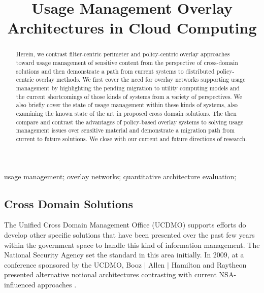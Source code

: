 \documentclass[10pt, conference, compsocconf]{IEEEtran}
\begin{document}
\title{Usage Management Overlay Architectures in Cloud Computing}

\author{
\and
{}
}

\maketitle


\begin{abstract}
Herein, we contrast filter-centric perimeter and policy-centric overlay approaches toward usage management of sensitive content from the perspective of cross-domain solutions and then demonstrate a path from current systems to distributed policy-centric overlay methods.  We first cover the need for overlay networks supporting usage management by highlighting the pending migration to utility computing models and the current shortcomings of those kinds of systems from a variety of perspectives.  We also briefly cover the state of usage management within these kinds of systems, also examining the known state of the art in proposed cross domain solutions.  The then compare and contrast the advantages of policy-based overlay systems to solving usage management issues over sensitive material and demonstrate a migration path from current to future solutions.  We close with our current and future directions of research. 
\end{abstract}

\begin{IEEEkeywords}
usage management; overlay networks; quantitative architecture evaluation;

\end{IEEEkeywords}

\IEEEpeerreviewmaketitle




\subsection{Cross Domain Solutions}
The Unified Cross Domain Management Office (UCDMO) supports efforts do develop other specific solutions that have been presented over the past few years within the government space to handle this kind of information management.  The National Security Agency set the standard in this area initially.  In 2009, at a conference sponsored by the UCDMO, Booz $\mid$ Allen $\mid$ Hamilton and Raytheon presented alternative notional architectures contrasting with current NSA-influenced approaches \cite{proposal:nsa-arch,proposal:gig-arch,proposal:bah-arch,proposal:raytheon-arch}.
\end{document}

